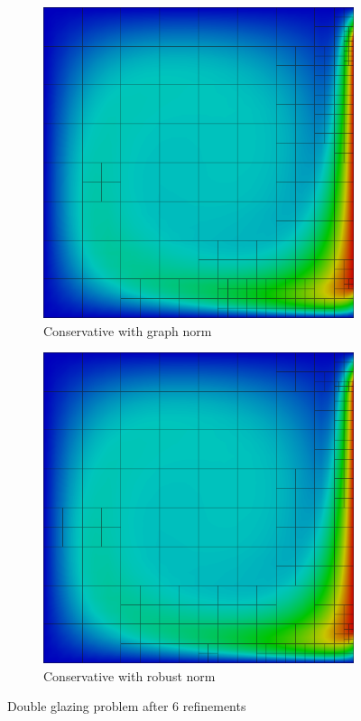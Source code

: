 \documentclass[letterpaper]{article}
\begin{document}
\begin{figure}
\centering
\begin{subfigure}[t]{0.45\textwidth}
\centering
\includegraphics[width=\textwidth]{figs/DoubleGlazing/graph6c.png}
\caption{Conservative with graph norm}
\label{fig:doubleglazingGraph6c}
\end{subfigure}
\begin{subfigure}[t]{0.45\textwidth}
\centering
\includegraphics[width=\textwidth]{figs/DoubleGlazing/robust6c.png}
\caption{Conservative with robust norm}
\label{fig:doubleglazingRobust6c}
\end{subfigure}
\caption{Double glazing problem after 6 refinements}
\label{fig:doubleglazing}
\end{figure}
\end{document}
